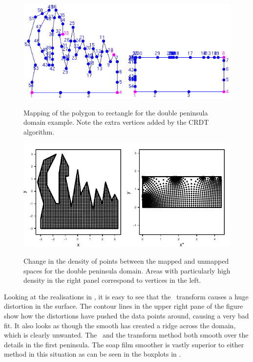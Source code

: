 \begin{figure}
\centering
\includegraphics{sc/figs/wigglytop2-numbered.png} \\
\caption{Mapping of the polygon to rectangle for the double peninsula domain example. Note the extra vertices added by the CRDT algorithm.}
\label{wigglytop2-numbered}
\end{figure}

\begin{figure}
\centering
\includegraphics{sc/figs/wt2-points.pdf} \\
\caption{Change in the density of points between the mapped and unmapped spaces for the double peninsula domain. Areas with particularly high density in the right panel correspond to vertices in the left.}
\label{wt2-points}
\end{figure}

Looking at the realisations in , it is easy to see that the \sch\ transform causes a huge distortion in the surface. The contour lines in the upper right pane of the figure show how the distortions have pushed the data points around, causing a very bad fit. It also looks as though the smooth has created a ridge across the domain, which is clearly unwanted. The \tprs\ and the transform method both smooth over the details in the first peninsula. The soap film smoother is vastly superior to either method in this situation as can be seen in the boxplots in .

